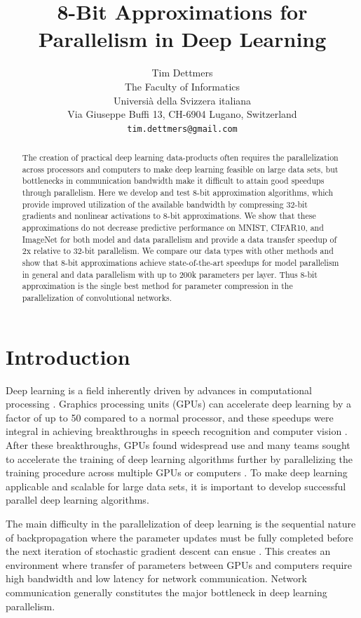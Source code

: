 \documentclass{article} %
\title{8-Bit Approximations for Parallelism in Deep Learning}
\author{Tim Dettmers \\
The Faculty of Informatics\\
Universià della Svizzera italiana\\
Via Giuseppe Buffi 13, CH-6904 Lugano, Switzerland \\
\texttt{tim.dettmers@gmail.com} 
}
\begin{document}
\maketitle

\begin{abstract}
The creation of practical deep learning data-products often requires the parallelization across processors and computers to make deep learning feasible on large data sets, but bottlenecks in communication bandwidth make it difficult to attain good speedups through parallelism. Here we develop and test 8-bit approximation algorithms, which provide improved utilization of the available bandwidth by compressing 32-bit gradients and nonlinear activations to 8-bit approximations. We show that these approximations do not decrease predictive performance on MNIST, CIFAR10, and ImageNet for both model and data parallelism and provide a data transfer speedup of 2x relative to 32-bit parallelism. We compare our data types with other methods and show that 8-bit approximations achieve state-of-the-art speedups for model parallelism in general and data parallelism with up to 200k parameters per layer. Thus 8-bit approximation is the single best method for parameter compression in the parallelization of convolutional networks.
\end{abstract}

\section{Introduction}
Deep learning is a field inherently driven by advances in computational processing \citep{schmidhuber2015deep}. Graphics processing units (GPUs) can accelerate deep learning by a factor of up to 50 compared to a normal processor, and these speedups were integral in achieving breakthroughs in speech recognition and computer vision \citep{ciresan2012multi, dahl2012context,krizhevsky2012imagenet}. After these breakthroughs, GPUs found widespread use and many teams sought to accelerate the training of deep learning algorithms further by parallelizing the training procedure across multiple GPUs or computers \citep{chilimbi2014project,coates2013deep,dean2012large,wu2015deep}. To make deep learning applicable and scalable for large data sets, it is important to develop successful parallel deep learning algorithms.

The main difficulty in the parallelization of deep learning is the sequential nature of backpropagation where the parameter updates must be fully completed before the next iteration of stochastic gradient descent can ensue \citep{rumelhart1988learning}. This creates an environment where transfer of parameters between GPUs and computers require high bandwidth and low latency for network communication. Network communication generally constitutes the major bottleneck in deep learning parallelism.
\end{document}

